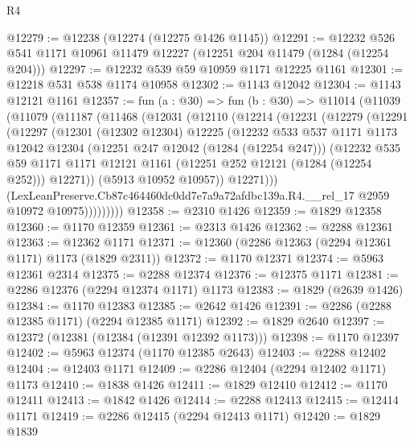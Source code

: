 \begin{lexlean}{R4}
\begin{coremodule}
@12279 := @12238 (@12274 (@12275 @1426 @1145))
@12291 := @12232 @526 @541 @1171 @10961 @11479 @12227 (@12251 @204 @11479 (@1284 (@12254 @204)))
@12297 := @12232 @539 @59 @10959 @1171 @12225 @1161
@12301 := @12218 @531 @538 @1174 @10958
@12302 := @1143 @12042
@12304 := @1143 @12121 @1161
@12357 := fun (a : @30) =>
  fun (b : @30) =>
  @11014
    (@11039
      (@11079
        (@11187
          (@11468
            (@12031
              (@12110
                (@12214
                  (@12231
                    (@12279
                      (@12291
                        (@12297
                          (@12301
                            (@12302 @12304)
                            @12225
                            (@12232
                              @533
                              @537
                              @1171
                              @1173
                              @12042
                              @12304
                              (@12251 @247 @12042 (@1284 (@12254 @247)))
                              (@12232
                                @535
                                @59
                                @1171
                                @1171
                                @12121
                                @1161
                                (@12251 @252 @12121 (@1284 (@12254 @252)))
                                @12271))
                            (@5913 @10952 @10957))
                          @12271)))
                    (LexLeanPreserve.Cb87c464460dc0dd7e7a9a72afdbc139a.R4.__rel_17
                      @2959
                      @10972
                      @10975)))))))))
@12358 := @2310 @1426
@12359 := @1829 @12358
@12360 := @1170 @12359
@12361 := @2313 @1426
@12362 := @2288 @12361
@12363 := @12362 @1171
@12371 := @12360 (@2286 @12363 (@2294 @12361 @1171) @1173 (@1829 @2311))
@12372 := @1170 @12371
@12374 := @5963 @12361 @2314
@12375 := @2288 @12374
@12376 := @12375 @1171
@12381 := @2286 @12376 (@2294 @12374 @1171) @1173
@12383 := @1829 (@2639 @1426)
@12384 := @1170 @12383
@12385 := @2642 @1426
@12391 := @2286 (@2288 @12385 @1171) (@2294 @12385 @1171)
@12392 := @1829 @2640
@12397 := @12372 (@12381 (@12384 (@12391 @12392 @1173)))
@12398 := @1170 @12397
@12402 := @5963 @12374 (@1170 @12385 @2643)
@12403 := @2288 @12402
@12404 := @12403 @1171
@12409 := @2286 @12404 (@2294 @12402 @1171) @1173
@12410 := @1838 @1426
@12411 := @1829 @12410
@12412 := @1170 @12411
@12413 := @1842 @1426
@12414 := @2288 @12413
@12415 := @12414 @1171
@12419 := @2286 @12415 (@2294 @12413 @1171)
@12420 := @1829 @1839

\end{coremodule}
\end{lexlean}
